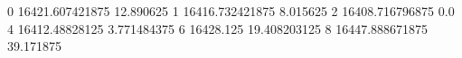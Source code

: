 0 16421.607421875 12.890625
1 16416.732421875 8.015625
2 16408.716796875 0.0
4 16412.48828125 3.771484375
6 16428.125 19.408203125
8 16447.888671875 39.171875
